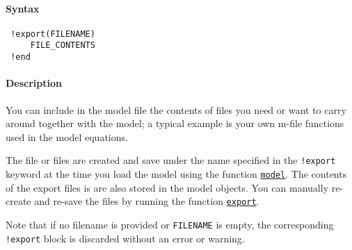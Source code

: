 


	\paragraph{Syntax}
 
 \begin{verbatim}
 !export(FILENAME)
     FILE_CONTENTS
 !end
 \end{verbatim}
 
 \paragraph{Description}
 
 You can include in the model file the contents of files you need or want
 to carry around together with the model; a typical example is your own
 m-file functions used in the model equations.
 
 The file or files are created and save under the name specified in the
 \texttt{!export} keyword at the time you load the model using the
 function \href{model/model}{\texttt{model}}. The contents of the export
 files is are also stored in the model objects. You can manually
 re-create and re-save the files by running the function
 \href{model/export}{\texttt{export}}.
 
 Note that if no filename is provided or \texttt{FILENAME} is empty, the
 corresponding \texttt{!export} block is discarded without an error or
 warning.


